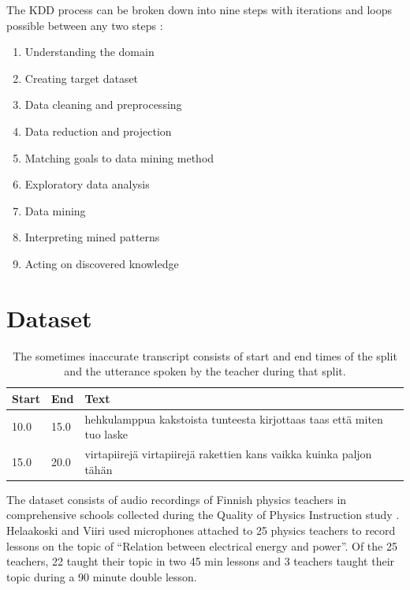 \documentclass[utf8,english]{gradu3}
\begin{document}
The KDD process can be broken down into nine steps with iterations and loops possible between any two steps \parencite{fayyadKDDProcessExtracting1996,fayyadKnowledgeDiscoveryData1996,fayyadDataMiningKnowledge1996}:

\begin{enumerate}
  \item Understanding the domain
  \item Creating target dataset
  \item Data cleaning and preprocessing
  \item Data reduction and projection
  \item Matching goals to data mining method
  \item Exploratory data analysis
  \item Data mining
  \item Interpreting mined patterns
  \item Acting on discovered knowledge
\end{enumerate}


\section{Dataset}

\begin{table}[]
  \begin{tabular}{ | l | l | l |}
  \hline
  \textbf{Start} & \textbf{End}  & \textbf{Text} \\ \hline
  10.0 & 15.0 & hehkulamppua kakstoista tunteesta kirjottaas taas että miten tuo laske\\ \hline
  15.0 & 20.0 & virtapiirejä virtapiirejä rakettien kans vaikka kuinka paljon tähän\\
  \hline
  \end{tabular}
  \caption{The sometimes inaccurate transcript consists of start and end times of the split and the utterance spoken by the teacher during that split.}
  \label{table:transcript}
\end{table}


The dataset consists of audio recordings of Finnish physics teachers in comprehensive schools collected during the Quality of Physics Instruction study \parencite{fischerQualityInstructionPhysics2014,helaakoskiContentContentStructure2014}. Helaakoski and Viiri \parencite*{helaakoskiContentContentStructure2014} used microphones attached to 25 physics teachers to record lessons on the topic of \enquote{Relation between electrical energy and power}. Of the 25 teachers, 22 taught their topic in two 45 min lessons and 3 teachers taught their topic during a 90 minute double lesson. 
\end{document}
